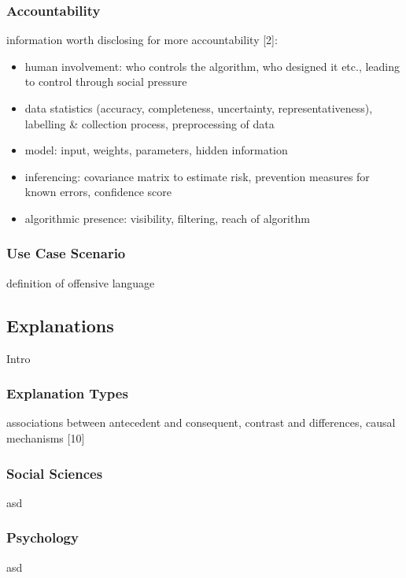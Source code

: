 \subsubsection{Accountability}
information worth disclosing for more accountability [2]:
\begin{itemize}
	\item human involvement: who controls the algorithm, who designed it etc., leading to control through social pressure
	\item data statistics (accuracy, completeness, uncertainty, representativeness), labelling \& collection process, preprocessing of data
	\item model: input, weights, parameters, hidden information
	\item inferencing: covariance matrix to estimate risk, prevention measures for known errors, confidence score 
	\item algorithmic presence: visibility, filtering, reach of algorithm
\end{itemize}


\subsubsection{Use Case Scenario}
definition of offensive language 



\subsection{Explanations}
Intro

\subsubsection{Explanation Types}
associations between antecedent and consequent, contrast and differences, causal mechanisms [10] \newline

\subsubsection{Social Sciences}
asd

\subsubsection{Psychology}
asd



